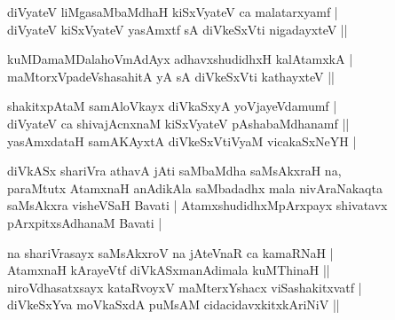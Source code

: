 \begin{entry}
\smallskip
\begin{shl}
diVyateV liMgasaMbaMdhaH kiSxVyateV ca malatarxyamf |\\
diVyateV kiSxVyateV yasAmxtf sA diVkeSxVti nigadayxteV ||
\end{shl}
\medskip
{}
\smallskip
\begin{shl}
kuMDamaMDalahoVmAdAyx adhavxshudidhxH kalAtamxkA |\\
maMtorxVpadeVshasahitA yA sA diVkeSxVti kathayxteV ||
\end{shl}
\medskip
{}
\smallskip
\begin{shl}
shakitxpAtaM samAloVkayx diVkaSxyA yoVjayeVdamumf |\\
diVyateV ca shivajAcnxnaM kiSxVyateV pAshabaMdhanamf ||\\
yasAmxdataH samAKAyxtA diVkeSxVtiVyaM vicakaSxNeYH |
\end{shl}
\medskip
{}
\smallskip
\begin{shl}
diVkASx shariVra athavA jAti saMbaMdha saMsAkxraH na,\\
paraMtutx AtamxnaH anAdikAla saMbadadhx mala nivAraNakaqta\\
saMsAkxra visheVSaH Bavati | AtamxshudidhxMpArxpayx shivatavx pArxpitxsAdhanaM Bavati |
\end{shl}
\smallskip
\begin{shl}
na shariVrasayx saMsAkxroV na jAteVnaR ca kamaRNaH |\\
AtamxnaH kArayeVtf diVkASxmanAdimala kuMThinaH ||\\
niroVdhasatxsayx kataRvoyxV maMterxYshacx viSashakitxvatf |\\
diVkeSxYva moVkaSxdA puMsAM cidacidavxkitxkAriNiV ||
\end{shl}
\medskip
{}
\smallskip

\end{entry}
